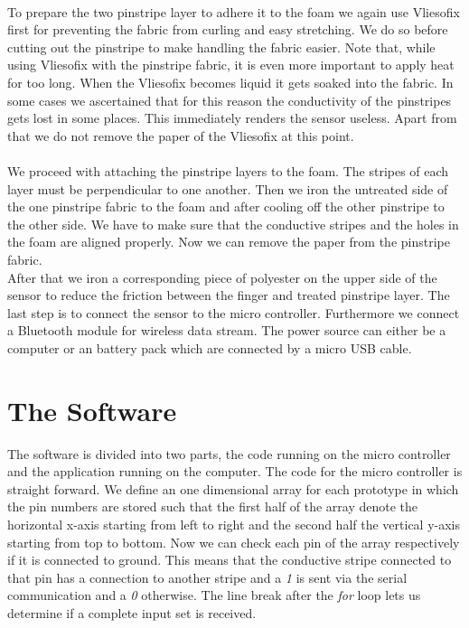 \\
To prepare the two pinstripe layer to adhere it to the foam we again use Vliesofix first for preventing the fabric from curling and easy stretching. We do so before cutting out the pinstripe to make handling the fabric easier. Note that, while using Vliesofix with the pinstripe fabric, it is even more important to apply heat for too long. When the Vliesofix becomes liquid it gets soaked into the fabric. In some cases we ascertained that for this reason the conductivity of the pinstripes gets lost in some places. This immediately renders the sensor useless. Apart from that we do not remove the paper of the Vliesofix at this point.
\\ \\
We proceed with attaching the pinstripe layers to the foam. The stripes of each layer must be perpendicular to one another. Then we iron the untreated side of the  one pinstripe fabric to the foam and after cooling off the other pinstripe to the other side.  We have to make sure that the conductive stripes and the holes in the foam are aligned properly. Now we can remove the paper from the pinstripe fabric.
\\
After that we iron a corresponding piece of polyester on the upper side of the sensor to reduce the friction between the finger and treated pinstripe layer. The last step is to connect the sensor to the micro controller. Furthermore we connect a   Bluetooth module for wireless data stream. The power source can either be a computer or an battery pack which are connected by a micro USB cable.
 
\section{The Software}

The software is divided into two parts, the code running on the micro controller and the application running on the computer. The code for the micro controller is straight forward. We define an one dimensional array for each prototype in which the pin numbers are stored such that the first half of the array denote the horizontal x-axis starting from left to right and the second half the vertical y-axis starting from top to bottom. Now we can check each pin of the array respectively if it is connected to ground. This means that the conductive stripe connected to that pin has a connection to another stripe and a \emph{1} is sent via the serial communication and a \emph{0} otherwise. The line break after the \emph{for} loop lets us determine if a complete input set is received.

